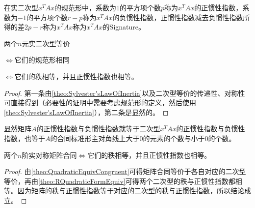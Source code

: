 \begin{definition}
	在实二次型$x^TAx$的规范形中，系数为$1$的平方项个数$p$称为$x^TAx$的正惯性指数，系数为$-1$的平方项个数$r-p$称为$x^TAx$的负惯性指数，正惯性指数减去负惯性指数所得的差$2p-r$称为$x^TAx$称为$x^TAx$的\gls{Signature}。
\end{definition}
\begin{theorem}\label{theo:RQuadraticFormEquiv}
	两个$n$元实二次型等价\par
	$\Leftrightarrow$它们的规范形相同\par
	$\Leftrightarrow$它们的秩相等，并且正惯性指数也相等。
\end{theorem}
\begin{proof}
	第一条由\cref{theo:Sylvester'sLawOfInertia}以及二次型等价的传递性、对称性可直接得到（必要性的证明中需要考虑规范形的定义，然后使用\cref{theo:Sylvester'sLawOfInertia}），第二条是显然的。
\end{proof}
显然矩阵$A$的正惯性指数与负惯性指数就等于二次型$x^TAx$的正惯性指数与负惯性指数，也等于$A$的合同标准形主对角线上大于$0$的元素的个数与小于$0$的个数。
\begin{theorem}
	两个$n$阶实对称矩阵合同$\Leftrightarrow$它们的秩相等，并且正惯性指数也相等。
\end{theorem}
\begin{proof}
	由\cref{theo:QuadraticEquivCongruent}可得矩阵合同等价于各自对应的二次型等价，再由\cref{theo:RQuadraticFormEquiv}可得两个二次型的秩与正惯性指数都相等。因为矩阵的秩与正惯性指数等于对应的二次型的秩与正惯性指数，所以结论成立。
\end{proof}
